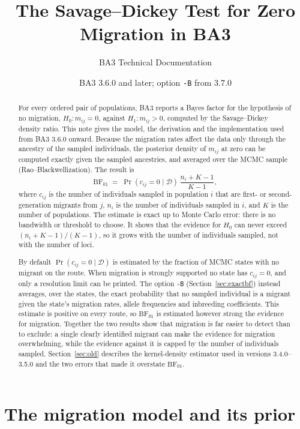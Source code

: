 \documentclass[11pt,a4paper]{article}
\title{The Savage--Dickey Test for Zero Migration in BA3}
\author{BA3 Technical Documentation}
\date{BA3 3.6.0 and later; option \texttt{-B} from 3.7.0}
\newcommand{\BF}{\mathrm{BF}}
\newcommand{\data}{\mathcal{D}}
\newcommand{\1}{\mathbf{1}}
\begin{document}
\maketitle

\begin{abstract}
For every ordered pair of populations, BA3 reports a Bayes factor for the
hypothesis of no migration, $H_0\colon m_{ij}=0$, against $H_1\colon m_{ij}>0$,
computed by the Savage--Dickey density ratio. This note gives the model, the
derivation and the implementation used from BA3 3.6.0 onward. Because the
migration rates affect the data only through the ancestry of the sampled
individuals, the posterior density of $m_{ij}$ at zero can be computed exactly
given the sampled ancestries, and averaged over the MCMC sample
(Rao--Blackwellization). The result is
\[
\BF_{01} \;=\; \Pr(c_{ij}=0 \mid \data)\,\frac{n_i+K-1}{K-1},
\]
where $c_{ij}$ is the number of individuals sampled in population $i$ that are
first- or second-generation migrants from $j$, $n_i$ is the number of
individuals sampled in $i$, and $K$ is the number of populations. The estimate
is exact up to Monte Carlo error: there is no bandwidth or threshold to choose.
It shows that the evidence for $H_0$ can never exceed $(n_i+K-1)/(K-1)$, so
it grows with the number of individuals sampled, not with the number of loci.

By default $\Pr(c_{ij}=0\mid\data)$ is estimated by the fraction of MCMC states
with no migrant on the route. When migration is strongly supported no state has
$c_{ij}=0$, and only a resolution limit can be printed. The option \texttt{-B}
(Section~\ref{sec:exactbf}) instead averages, over the states, the exact
probability that no sampled individual is a migrant given the state's migration
rates, allele frequencies and inbreeding coefficients. This estimate is positive
on every route, so $\BF_{01}$ is estimated however strong the evidence for
migration. Together the two results show that migration is far easier to detect
than to exclude: a single clearly identified migrant can make the evidence for
migration overwhelming, while the evidence against it is capped by the number of
individuals sampled. Section~\ref{sec:old} describes the kernel-density estimator
used in versions 3.4.0--3.5.0 and the two errors that made it overstate
$\BF_{01}$.
\end{abstract}

\tableofcontents

\section{The migration model and its prior}
\label{sec:model}
\end{document}
